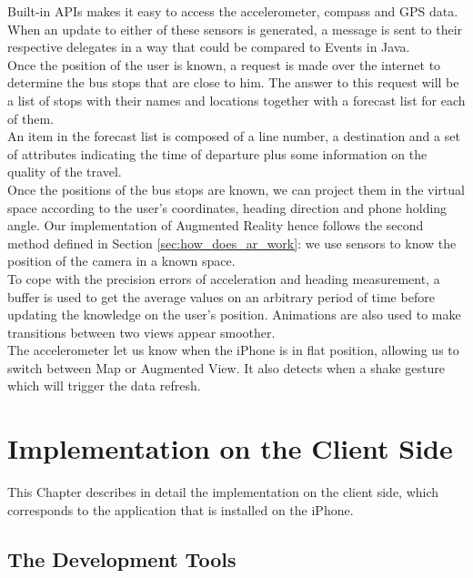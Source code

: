 Built-in APIs makes it easy to access the accelerometer, compass and GPS data. When an update to either of these sensors is generated, a message is sent to their respective delegates in a way that could be compared to Events in Java.\\

Once the position of the user is known, a request is made over the internet to determine the bus stops that are close to him. The answer to this request will be a list of stops with their names and locations together with a forecast list for each of them.\\

An item in the forecast list is composed of a line number, a destination and a set of attributes indicating the time of departure plus some information on the quality of the travel.\\

Once the positions of the bus stops are known, we can project them in the virtual space according to the user's coordinates, heading direction and phone holding angle. Our implementation of Augmented Reality hence follows the second method defined in Section \ref{sec:how_does_ar_work}: we use sensors to know the position of the camera in a known space.\\

To cope with the precision errors of acceleration and heading measurement, a buffer is used to get the average values on an arbitrary period of time before updating the knowledge on the user's position. Animations are also used to make transitions between two views appear smoother.\\

The accelerometer let us know when the iPhone is in flat position, allowing us to switch between Map or Augmented View. It also detects when a shake gesture which will trigger the data refresh.


\chapter{Implementation on the Client Side}
\label{cha:on_the_client_side}

This Chapter describes in detail the implementation on the client side, which corresponds to the application that is installed on the iPhone.

\section{The Development Tools}

